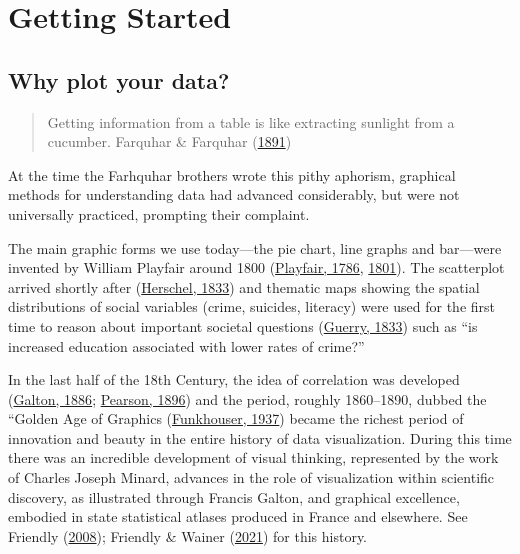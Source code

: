 \documentclass[
  letterpaper,
  10pt,
  krantz2]{krantz}
\newcommand{\ix}[1]{\index{#1}}
\begin{document}

\hypertarget{sec-getting_started}{%
\chapter{Getting Started}\label{sec-getting_started}}

\hypertarget{sec-why_plot}{%
\section{Why plot your data?}\label{sec-why_plot}}

\begin{quote}
Getting information from a table is like extracting sunlight from a
cucumber. Farquhar \& Farquhar
(\protect\hyperlink{ref-FarquharFarquhar:91}{1891})
\end{quote}

At the time the Farhquhar brothers wrote this pithy aphorism, graphical
methods for understanding data had advanced considerably, but were not
universally practiced, prompting their complaint.

The main graphic forms we use today---the pie chart, line graphs and
bar---were invented by William Playfair around 1800
(\protect\hyperlink{ref-Playfair:1786}{Playfair, 1786},
\protect\hyperlink{ref-Playfair:1801}{1801}). The scatterplot arrived
shortly after (\protect\hyperlink{ref-Herschel:1833}{Herschel, 1833})
and thematic maps showing the spatial distributions of social variables
(crime, suicides, literacy) were used for the first time to reason about
important societal questions
(\protect\hyperlink{ref-Guerry:1833}{Guerry, 1833}) such as ``is
increased education associated with lower rates of crime?''
\ix{pie chart} \ix{bar chart} \ix{line graph} \ix{scatterplot}

In the last half of the 18th Century, the idea of correlation was
developed (\protect\hyperlink{ref-Galton:1886}{Galton, 1886};
\protect\hyperlink{ref-Pearson:1896}{Pearson, 1896}) and the period,
roughly 1860--1890, dubbed the ``Golden Age of Graphics
(\protect\hyperlink{ref-Funkhouser:1937}{Funkhouser, 1937}) became the
richest period of innovation and beauty in the entire history of data
visualization. During this time there was an incredible development of
visual thinking, represented by the work of Charles Joseph Minard,
advances in the role of visualization within scientific discovery, as
illustrated through Francis Galton, and graphical excellence, embodied
in state statistical atlases produced in France and elsewhere. See
Friendly (\protect\hyperlink{ref-Friendly:2008:golden}{2008}); Friendly
\& Wainer (\protect\hyperlink{ref-FriendlyWainer:2021:TOGS}{2021}) for
this history.
\end{document}
